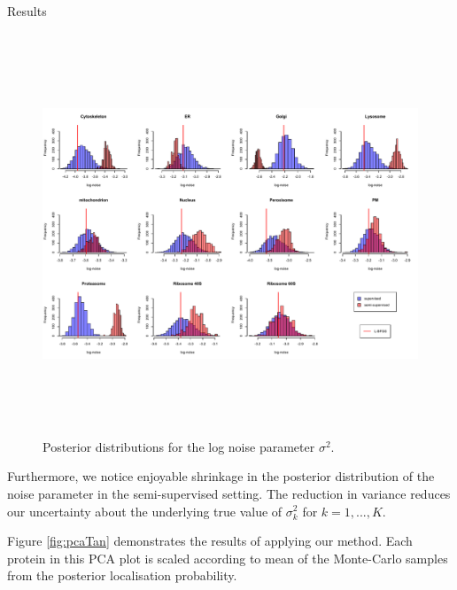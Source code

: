 \documentclass[final, 10pt]{beamer}
\newlength{\onecolwid}
\newlength{\twocolwid}
\begin{document}
\begin{frame}[t]
\begin{columns}[t]
\begin{column}{\twocolwid}
\begin{columns}[t,totalwidth=\twocolwid]
\begin{column}{\onecolwid}
\begin{block}{Results}
\begin{itemize}
{      	\begin{figure}[h]
      		\centering
      		\includegraphics[width= 20cm, height = 12cm]{PosteriorHistTan2009}
      		\centering
      		\caption{ Posterior distributions for the log noise parameter $\sigma^2$.
      		}
      		\label{fig:PosteriorTan}
      	\end{figure}	
      	\item Furthermore, we notice enjoyable shrinkage in the posterior distribution of the noise parameter in the semi-supervised setting. The reduction in variance reduces our uncertainty about the underlying true value of $\sigma_k^2$ for $k = 1,...,K$. 
      	\item  Figure \ref{fig:pcaTan} demonstrates the results of applying our method. Each protein in this PCA plot is scaled according to mean of the Monte-Carlo samples from the posterior localisation probability.
  		}
      	\end{itemize}
      	  

\end{block}
\end{column}
\end{columns}
\end{column}
\end{columns}
\end{frame}
\end{document}
